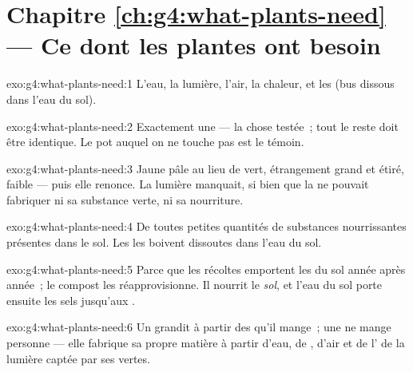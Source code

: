\section*{Chapitre \ref{ch:g4:what-plants-need} --- Ce dont les plantes ont besoin}

\begin{solution}{exo:g4:what-plants-need:1}
L'eau, la lumière, l'air, la chaleur, et les  (bus
dissous dans l'eau du sol).
\end{solution}

\begin{solution}{exo:g4:what-plants-need:2}
Exactement une --- la chose testée~; tout le reste doit être
identique. Le pot auquel on ne touche pas est le témoin.
\end{solution}

\begin{solution}{exo:g4:what-plants-need:3}
Jaune pâle au lieu de vert, étrangement grand et étiré, faible ---
puis elle renonce. La lumière manquait, si bien que la  ne
pouvait fabriquer ni sa substance verte, ni sa nourriture.
\end{solution}

\begin{solution}{exo:g4:what-plants-need:4}
De toutes petites quantités de substances nourrissantes présentes
dans le sol. Les  les boivent dissoutes dans l'eau du sol.
\end{solution}

\begin{solution}{exo:g4:what-plants-need:5}
Parce que les récoltes emportent les  du sol année
après année~; le compost les réapprovisionne. Il nourrit le
\emph{sol}, et l'eau du sol porte ensuite les sels jusqu'aux
.
\end{solution}

\begin{solution}{exo:g4:what-plants-need:6}
Un  grandit à partir des  qu'il mange~; une
 ne mange personne --- elle fabrique sa propre matière à
partir d'eau, de , d'air et de l' de la lumière
captée par ses  vertes.
\end{solution}


